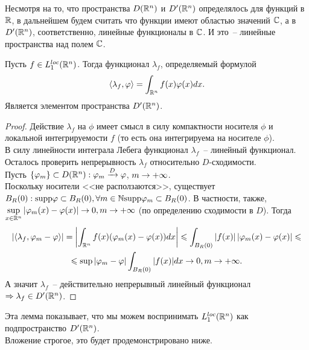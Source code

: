 
\begin{remark}
    Несмотря на то, что пространства $D(\mathbb{R}^n)$ и $D'(\mathbb{R}^n)$ определялось для функций в $\mathbb{R}$, в дальнейшем будем считать что функции имеют областью значений $\mathbb{C}$, а в $D'(\mathbb{R}^n)$, соответственно, линейные функционалы в $\mathbb{C}$.
    И это~-- линейные пространства над полем $\mathbb{C}$.
\end{remark}
\begin{lemma}
    Пусть $f \in L_1^{loc}(\mathbb{R}^n)$.
    Тогда функционал $\lambda_f$, определяемый формулой
    \[
        \langle \lambda_f, \varphi \rangle= \int_{\mathbb{R}^n} f(x) \varphi(x) dx. \label{lambda_f_functional}
    \]
    Является элементом пространства $D'(\mathbb{R}^n)$.
\end{lemma}
\begin{proof}
    Действие $\lambda_f$ на $\phi$ имеет смысл в силу компактности носителя $\phi$ и локальной интегрируемости $f$ (то есть она интегрируема на носителе $\phi$). \\
    В силу линейности интеграла Лебега функционал $\lambda_f$~-- линейный функционал. \\
    Осталось проверить непрерывность $\lambda_f$ относительно $D$-сходимости. \\
    Пусть $\{\varphi_m\} \subset D(\mathbb{R}^n): \varphi_m \xrightarrow{D} \varphi$, $m \rightarrow +\infty$.
    \\
    Поскольку носители <<не расползаются>>, существует $B_R(0): \text{supp} \varphi \subset B_R(0), \forall m \in \mathbb{N} \text{supp} \varphi_m \subset B_R(0)$.
    В частности, также, $\sup\limits_{x \in \mathbb{R}^n}|\varphi_m(x) - \varphi(x)| \rightarrow 0, m \rightarrow +\infty$ (по определению сходимости в $D$).
    Тогда
    \begin{multline*}
        |\langle \lambda_f, \varphi_m - \varphi \rangle | = \left|\int_{\mathbb{R}^n} f(x)(\varphi_m(x) - \varphi(x))dx\right| \leqslant \int_{B_R(0)} \left|f(x)\right|\left|\varphi_m(x) - \varphi(x)\right| \leqslant \\ \leqslant \sup |\varphi_m - \varphi| \int_{B_R(0)} |f(x)|dx \rightarrow 0, m \rightarrow +\infty.
    \end{multline*}
    А значит $\lambda_f$~-- действительно непрерывный линейный функционал $\Rightarrow \lambda_f \in D'(\mathbb{R}^n)$.
\end{proof}
\begin{note}
    Эта лемма показывает, что мы можем воспринимать $L_1^{loc}(\mathbb{R}^n)$ как подпространство $D'(\mathbb{R}^n)$. \\
    Вложение строгое, это будет продемонстрировано ниже.
\end{note}


